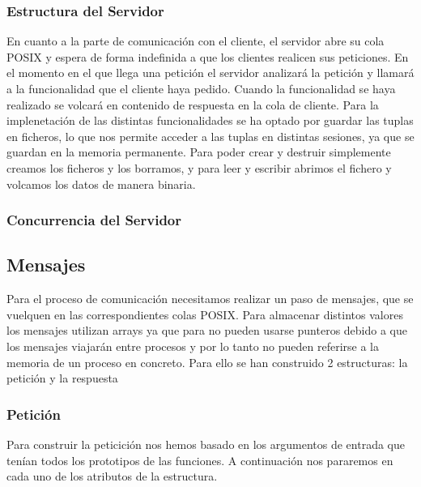\documentclass[]{article}
\begin{document}
\subsubsection{Estructura del Servidor}
\label{subsec::estructura_servidor}
En cuanto a la parte de comunicación con el cliente, el servidor abre su cola POSIX y espera de forma indefinida a que los clientes realicen sus peticiones. En el momento en el que llega una petición el servidor analizará la petición y llamará a la funcionalidad que el cliente haya pedido. Cuando la funcionalidad se haya realizado se volcará en contenido de respuesta en la cola de cliente.
Para la implenetación de las distintas funcionalidades se ha optado por guardar las tuplas en ficheros, lo que nos permite acceder a las tuplas en distintas sesiones, ya que se guardan en la memoria permanente.
Para poder crear y destruir simplemente creamos los ficheros y los borramos, y para leer y escribir abrimos el fichero y volcamos los datos de manera binaria.

\subsubsection{Concurrencia del Servidor}
\label{subsec::concurrencia_servidor}


\subsection{Mensajes}
\label{subsec:mensajes}
Para el proceso de comunicación necesitamos realizar un paso de mensajes, que se vuelquen en las correspondientes colas POSIX. Para almacenar distintos valores los mensajes utilizan arrays ya que para no pueden usarse punteros debido a que los mensajes viajarán entre procesos y por lo tanto no pueden referirse a la memoria de un proceso en concreto.
Para ello se han construido 2 estructuras: la petición y la respuesta
\subsubsection{Petición}
\label{subsec::peticion}
Para construir la peticición nos hemos basado en los argumentos de entrada que tenían todos los prototipos de las funciones. A continuación nos pararemos en cada uno de los atributos de la estructura.
\end{document}
